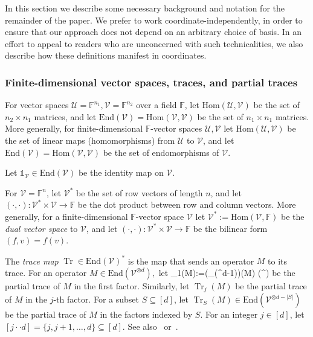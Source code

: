 \documentclass[11pt]{article}
\numberwithin{theorem}{section}
\theoremstyle{definition}
\newcommand{\tr}{\operatorname{Tr}}
\newcommand{\I}{\mathds{1}}
\newcommand{\setft}[1]{\mathrm{#1}}
\newcommand{\field}{\mathbb{F}}
\newcommand\V{\mathcal{V}}
\newcommand\U{\mathcal{U}}
\newcommand{\End}{\setft{End}}
\newcommand{\Hom}{\setft{Hom}}
\def\ba#1\ea{\begin{align}#1\end{align}}
\begin{document}
In this section we describe some necessary background and notation for the remainder of the paper. We prefer to work coordinate-independently, in order to ensure that our approach does not depend on an arbitrary choice of basis. In an effort to appeal to readers who are unconcerned with such technicalities, we also describe how these definitions manifest in coordinates.

\subsubsection*{Finite-dimensional vector spaces, traces, and partial traces}


For vector spaces $\U=\field^{n_1}, \V=\field^{n_2}$ over a field $\field$, let $\Hom(\U,\V)$ be the set of $n_2 \times n_1$ matrices, and let $\End(\V)=\Hom(\V,\V)$ be the set of $n_1 \times n_1$ matrices. More generally, for finite-dimensional $\field$-vector spaces $\U, \V$ let $\Hom(\U,\V)$ be the set of linear maps (homomorphisms) from $\U$ to $\V$, and let $\End(\V)=\Hom(\V,\V)$ be the set of endomorphisms of $\V$.

Let $\I_{\V}\in \End(\V)$ be the identity map on $\V$.

For $\V=\field^n$, let $\V^*$ be the set of row vectors of length $n$, and let $(\cdot, \cdot) : \V^* \times \V \rightarrow \field$ be the dot product between row and column vectors. More generally, for a finite-dimensional $\field$-vector space $\V$ let $\V^*:=\Hom(\V,\field)$ be the \textit{dual vector space} to $\V$, and let $(\cdot, \cdot) : \V^* \times \V \rightarrow \field$ be the bilinear form $(f,v) = f(v)$. %





The \textit{trace map} $\tr \in \End(\V)^*$ is the map that sends an operator $M$ to its trace. For an operator ${M \in \End(\V^{\otimes d})},$ let
\ba
\tr_1(M):=(\tr \otimes \I_{\End(\V^{\otimes d-1})})(M) \in \End(\V^{})
\ea
be the partial trace of $M$ in the first factor. Similarly, let $\tr_j(M)$ be the partial trace of $M$ in the $j$-th factor. For a subset $S \subseteq [d]$, let $\tr_S(M) \in \End(\V^{\otimes {d-|S|}})$ be the partial trace of $M$ in the factors indexed by $S$. For an integer $j \in [d]$, let $[j\cdot \cdot d]=\{j,j+1,\dots, d\} \subseteq [d]$. See also~\cite{doherty2012convergence} or~\cite{Wat18}.
\end{document}
